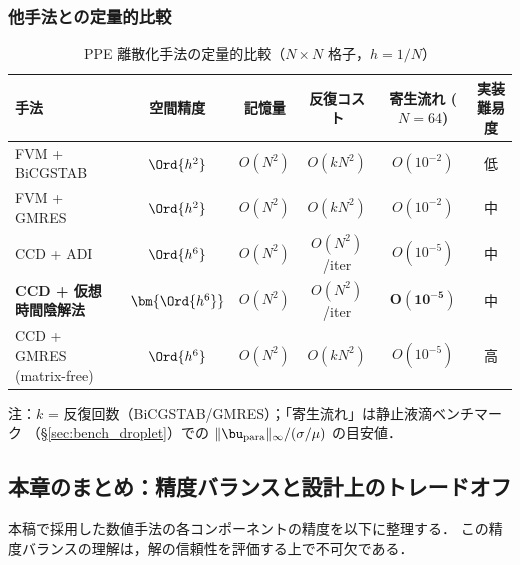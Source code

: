 \subsubsection{他手法との定量的比較}
\label{sec:ccd_vs_fvm}

\begin{table}[ht]
\centering
\caption{PPE 離散化手法の定量的比較（$N \times N$ 格子，$h = 1/N$）}
\label{tab:ccd_vs_fvm}
\renewcommand{\arraystretch}{1.4}
\begin{tabular}{lccccc}
\hline
手法 & 空間精度 & 記憶量 & 反復コスト & 寄生流れ ($N=64$) & 実装難易度 \\
\hline
FVM + BiCGSTAB & $\Ord{h^2}$ & $O(N^2)$ & $O(kN^2)$ & $O(10^{-2})$ & 低 \\
FVM + GMRES & $\Ord{h^2}$ & $O(N^2)$ & $O(kN^2)$ & $O(10^{-2})$ & 中 \\
CCD + ADI & $\Ord{h^6}$ & $O(N^2)$ & $O(N^2)$/iter & $O(10^{-5})$ & 中 \\
\textbf{CCD + 仮想時間陰解法} & $\bm{\Ord{h^6}}$ & $O(N^2)$ & $O(N^2)$/iter & $\bm{O(10^{-5})}$ & 中 \\
CCD + GMRES (matrix-free) & $\Ord{h^6}$ & $O(N^2)$ & $O(kN^2)$ & $O(10^{-5})$ & 高 \\
\hline
\end{tabular}

\smallskip
注：$k$ = 反復回数（BiCGSTAB/GMRES）；「寄生流れ」は静止液滴ベンチマーク
（§\ref{sec:bench_droplet}）での $\|\bu_{\mathrm{para}}\|_\infty/(\sigma/\mu)$ の目安値．
\end{table}

\subsection{本章のまとめ：精度バランスと設計上のトレードオフ}
\label{sec:pressure_accuracy_summary}

本稿で採用した数値手法の各コンポーネントの精度を以下に整理する．
この精度バランスの理解は，解の信頼性を評価する上で不可欠である．


